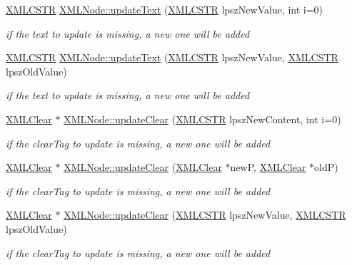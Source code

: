 \begin{DoxyCompactItemize}
\hyperlink{xmlParser_8h_acdb0d6fd8dd596384b438d86cfb2b182}{X\-M\-L\-C\-S\-T\-R} \hyperlink{group__xmlUpdate_gaad04ffd86ca67253bbc81f941608f8d2}{X\-M\-L\-Node\-::update\-Text} (\hyperlink{xmlParser_8h_acdb0d6fd8dd596384b438d86cfb2b182}{X\-M\-L\-C\-S\-T\-R} lpsz\-New\-Value, int i=0)
\begin{DoxyCompactList}\small\item\em if the text to update is missing, a new one will be added \end{DoxyCompactList}\item 
\hyperlink{xmlParser_8h_acdb0d6fd8dd596384b438d86cfb2b182}{X\-M\-L\-C\-S\-T\-R} \hyperlink{group__xmlUpdate_ga476a872fa595ea8416d2991ce3bea7a6}{X\-M\-L\-Node\-::update\-Text} (\hyperlink{xmlParser_8h_acdb0d6fd8dd596384b438d86cfb2b182}{X\-M\-L\-C\-S\-T\-R} lpsz\-New\-Value, \hyperlink{xmlParser_8h_acdb0d6fd8dd596384b438d86cfb2b182}{X\-M\-L\-C\-S\-T\-R} lpsz\-Old\-Value)
\begin{DoxyCompactList}\small\item\em if the text to update is missing, a new one will be added \end{DoxyCompactList}\item 
\hyperlink{structXMLClear}{X\-M\-L\-Clear} $\ast$ \hyperlink{group__xmlUpdate_gafe78ceff29e1853fdef9f9c3ac2605eb}{X\-M\-L\-Node\-::update\-Clear} (\hyperlink{xmlParser_8h_acdb0d6fd8dd596384b438d86cfb2b182}{X\-M\-L\-C\-S\-T\-R} lpsz\-New\-Content, int i=0)
\begin{DoxyCompactList}\small\item\em if the clear\-Tag to update is missing, a new one will be added \end{DoxyCompactList}\item 
\hyperlink{structXMLClear}{X\-M\-L\-Clear} $\ast$ \hyperlink{group__xmlUpdate_ga1279bfaade1376d25342440bd14dbb74}{X\-M\-L\-Node\-::update\-Clear} (\hyperlink{structXMLClear}{X\-M\-L\-Clear} $\ast$new\-P, \hyperlink{structXMLClear}{X\-M\-L\-Clear} $\ast$old\-P)
\begin{DoxyCompactList}\small\item\em if the clear\-Tag to update is missing, a new one will be added \end{DoxyCompactList}\item 
\hyperlink{structXMLClear}{X\-M\-L\-Clear} $\ast$ \hyperlink{group__xmlUpdate_ga49ad66755cd9b69fc1ec7a78cd162c70}{X\-M\-L\-Node\-::update\-Clear} (\hyperlink{xmlParser_8h_acdb0d6fd8dd596384b438d86cfb2b182}{X\-M\-L\-C\-S\-T\-R} lpsz\-New\-Value, \hyperlink{xmlParser_8h_acdb0d6fd8dd596384b438d86cfb2b182}{X\-M\-L\-C\-S\-T\-R} lpsz\-Old\-Value)
\begin{DoxyCompactList}\small\item\em if the clear\-Tag to update is missing, a new one will be added \end{DoxyCompactList}\end{DoxyCompactItemize}



